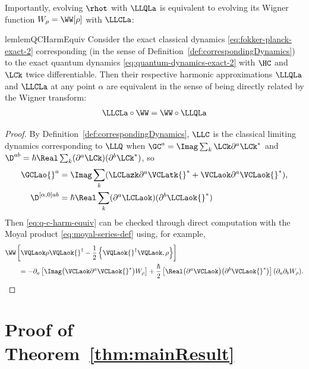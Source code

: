 \documentclass{article}
\numberwithin{equation}{section}
\begin{document}
Importantly, evolving $\rhot$ with $\LLQLa$ is equivalent to evolving its Wigner function $W_\rho =\WW[\rho]$ with $\LLCLa$: 
\begin{restatable}{lem}{lemQCHarmEquiv}\label{lem:q-c-harm-equiv}
    Consider the exact classical dynamics \eqref{eq:fokker-planck-exact-2} corresponding (in the sense of Definition~\ref{def:correspondingDynamics}) to the exact quantum dynamics \eqref{eq:quantum-dynamics-exact-2} with $\HC$ and $\LCk$ twice differentiable.  Then their respective harmonic approximations $\LLQLa$ and $\LLCLa$ at any point $\alpha$ are equivalent in the sense of being directly related by the Wigner transform:
	\begin{align}\label{eq:q-c-harm-equiv}
		\LLCLa \circ \WW = \WW \circ \LLQLa 
	\end{align}
\end{restatable}
\begin{proof}
    By Definition~\ref{def:correspondingDynamics}, $\LLC$ is the classical limiting dynamics corresponding to $\LLQ$ when $\GC^a =\Imag \sum_k \LCk \partial^a \LCk^*$ and $\D^{ab}= \hbar \Real \sum_k (\partial^a \LCk)(\partial^b \LCk^*)$, so
    \begin{align}
        \GCLao{}^a &= \Imag \sum_k (\LCLazk \partial^a  \VCLatk{}^* + \VCLaok \partial^a  \VCLaok{}^*), \\
        \D^{[\alpha,0]ab} &= \hbar \Real \sum_k (\partial^a \LCLaok)(\partial^b  \LCLaok{}^*)
    \end{align}    
    Then \eqref{eq:q-c-harm-equiv} can be checked through direct computation with the Moyal product \eqref{eq:moyal-series-def} 
    using, for example, 
    \begin{align}\begin{split}
        & \WW\left[\VQLaok \rho \VQLaok{}^\dagger - \frac{1}{2} \left\{ \VQLaok{}^\dagger \VQLaok,\rho\right\} \right] 
        \\
        & \qquad =  - \partial_a\left[\Imag \big( \VCLaok \partial^a \VCLaok {}^* \big) W_\rho \right] +  \frac{\hbar}{2}  \left[ \Real \big(\partial^a \VCLaok\big)\big(\partial^b  \VCLaok{}^*\big)\right](\partial_a \partial_b W_\rho).
    \end{split}\end{align}
\end{proof}





\section{Proof of Theorem~\ref{thm:mainResult}}\label{sec:main_proof}
\end{document}
